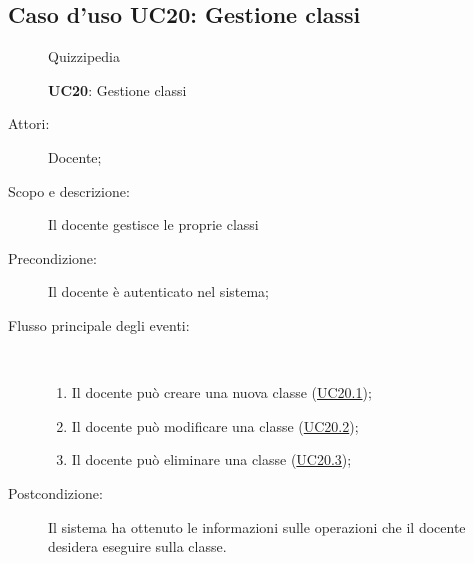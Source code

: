 \subsection{Caso d'uso UC20: Gestione classi}
\begin{figure}[H]
	\centering
	\begin{resizedtikzpicture}{\textwidth}
		\begin{umlsystem}[x=0, fill=lightgray!20]{Quizzipedia}
		\end{umlsystem}
	\end{resizedtikzpicture}
	\caption{\textbf{UC20}: Gestione classi}
	\label{UC20}
\end{figure}
\begin{description}
	\item[Attori:] Docente;
	\item[Scopo e descrizione:] Il docente gestisce le proprie classi
	\item[Precondizione:] Il docente è autenticato nel sistema;
	
	\item[Flusso principale degli eventi:] \ 
	\begin{enumerate}
		\item Il docente può creare una nuova classe (\hyperlink{UC20.1}{UC20.1});
		\item Il docente può modificare una classe (\hyperlink{UC20.2}{UC20.2});
		\item Il docente può eliminare una classe (\hyperlink{UC20.3}{UC20.3});
		
	\end{enumerate}
	\item[Postcondizione:] Il sistema ha ottenuto le informazioni sulle operazioni che il docente desidera eseguire sulla classe.
\end{description}
\hypertarget{UC20.1}{}

